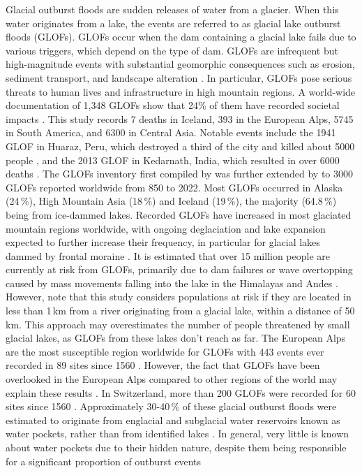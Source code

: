 Glacial outburst floods are sudden releases of water from a glacier. When this water originates from a lake, the events are referred to as glacial lake outburst floods (GLOFs). GLOFs occur when the dam containing a glacial lake fails due to various triggers, which depend on the type of dam. GLOFs are infrequent but high-magnitude events with substantial geomorphic consequences such as erosion, sediment transport, and landscape alteration \citep[e.g.][]{Cook&al2018}. In particular, GLOFs pose serious threats to human lives and infrastructure in high mountain regions. A world-wide documentation of 1,348 GLOFs show that 24\% of them have recorded societal impacts \citep{Carrivick&Tweed2016}. This study records 7 deaths in Iceland, 393 in the European Alps, 5745 in South America, and 6300 in Central Asia. Notable events include the 1941 GLOF in Huaraz, Peru, which destroyed a third of the city and killed about 5000 people \citep{Carey2005}, and the 2013 GLOF in Kedarnath, India, which resulted in over 6000 deaths \citep{Allen&al2016}. The GLOFs inventory first compiled by \cite{Carrivick&Tweed2016} was further extended by \cite{Emmer&al2022, Veh&al2022, Lutzow&al2023} to 3000 GLOFs reported worldwide from 850 to 2022. Most GLOFs occurred in Alaska (24\,\%), High Mountain Asia (18\,\%) and Iceland (19\,\%), the majority (64.8\,\%) being from ice-dammed lakes. Recorded GLOFs have increased in most glaciated mountain regions worldwide, with ongoing deglaciation and lake expansion expected to further increase their frequency, in particular for glacial lakes dammed by frontal moraine \citep{Harrison&al2018,Zhang&al2024}. It is estimated that over 15 million people are currently at risk from GLOFs, primarily due to dam failures or wave overtopping caused by mass movements falling into the lake in the Himalayas and Andes \citep{Taylor&al2023}. However, note that this study considers populations at risk if they are located in less than 1\,km from a river originating from a glacial lake, within a distance of 50\,km. This approach may overestimates the number of people threatened by small glacial lakes, as GLOFs from these lakes don't reach as far. %
The European Alps are the most susceptible region worldwide for GLOFs with 443 events ever recorded in 89 sites since 1560 \citep{Carrivick&Tweed2016,Lutzow&al2023}. However, the fact that GLOFs have been overlooked in the European Alps compared to other regions of the world may explain these results \citep{Veh&al2022}. In Switzerland, more than 200 GLOFs were recorded for 60 sites since 1560 \citep{Carrivick&Tweed2016}. Approximately 30-40\,\% of these glacial outburst floods were estimated to originate from englacial and subglacial water reservoirs known as water pockets, rather than from identified lakes \citep{Haeberli1983}. In general, very little is known about water pockets due to their hidden nature, despite them being responsible for a significant proportion of outburst events 

